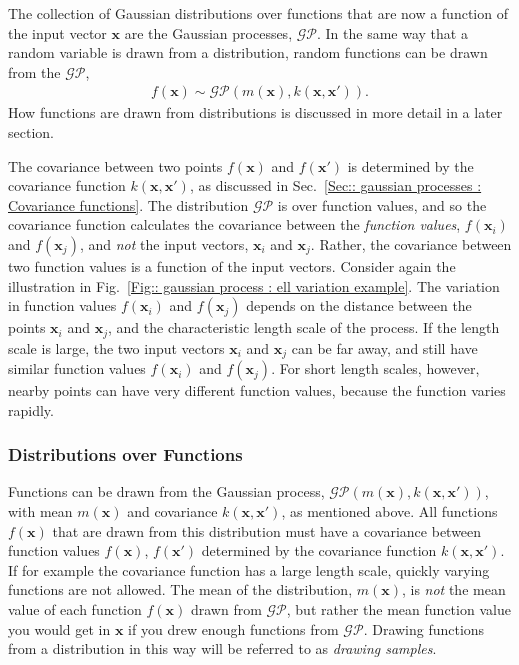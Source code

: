 \documentclass[twoside,english]{uiofysmaster}
\begin{document}
The collection of Gaussian distributions over functions that are now a function of the input vector $\textbf{x}$ are the Gaussian processes, $\mathcal{GP}$. In the same way that a random variable is drawn from a distribution, random functions can be drawn from the $\mathcal{GP}$,
\begin{align}
f(\textbf{x}) \sim \mathcal{GP}(m(\textbf{x}), k(\textbf{x}, \textbf{x}')).
\end{align}
How functions are drawn from distributions is discussed in more detail in a later section.

The covariance between two points $f(\textbf{x})$ and $f(\textbf{x}')$ is determined by the covariance function $k(\textbf{x}, \textbf{x}')$, as discussed in Sec.~\ref{Sec:: gaussian processes : Covariance functions}. The distribution $\mathcal{GP}$ is over function values, and so the covariance function calculates the covariance between the \textit{function values}, $f(\textbf{x}_i)$ and $f(\textbf{x}_j)$, and \textit{not} the input vectors, $\textbf{x}_i$ and $\textbf{x}_j$. Rather, the covariance between two function values is a function of the input vectors. Consider again the illustration in Fig.~\ref{Fig:: gaussian process : ell variation example}. The variation in function values $f(\textbf{x}_i)$ and $f(\textbf{x}_j)$ depends on the distance between the points $\textbf{x}_i$ and $\textbf{x}_j$, and the characteristic length scale of the process. If the length scale is large, the two input vectors $\textbf{x}_i$ and $\textbf{x}_j$ can be far away, and still have similar function values $f(\textbf{x}_i)$ and $f(\textbf{x}_j)$. For short length scales, however, nearby points can have very different function values, because the function varies rapidly.

\subsubsection{Distributions over Functions}

Functions can be drawn from the Gaussian process, $\mathcal{GP}(m(\textbf{x}), k(\textbf{x}, \textbf{x}'))$, with mean $m(\textbf{x})$ and covariance $k(\textbf{x}, \textbf{x}')$, as mentioned above. All functions $f(\textbf{x})$ that are drawn from this distribution must have a covariance between function values $f(\textbf{x})$, $f(\textbf{x}')$ determined by the covariance function $k(\textbf{x}, \textbf{x}')$. If for example the covariance function has a large length scale, quickly varying functions are not allowed. The mean of the distribution, $m(\textbf{x})$, is \textit{not} the mean value of each function $f(\textbf{x})$ drawn from $\mathcal{GP}$, but rather the mean function value you would get in $\textbf{x}$ if you drew enough functions from $\mathcal{GP}$. Drawing functions from a distribution in this way will be referred to as \textit{drawing samples}.
\end{document}
